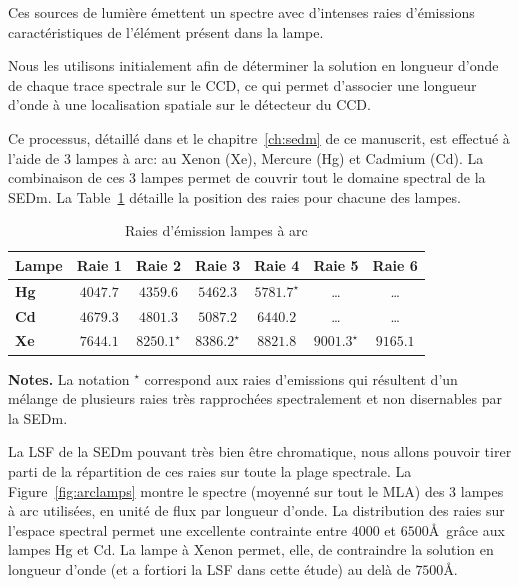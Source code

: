 \documentclass[../main/main.tex]{subfiles}
\begin{document}
Ces sources de lumière émettent un spectre avec d'intenses raies
d'émissions caractéristiques de l'élément présent dans la lampe.

Nous les utilisons initialement afin de déterminer la solution en longueur
d'onde de chaque trace spectrale sur le CCD, ce qui permet d'associer une longueur d'onde à une localisation spatiale
sur le détecteur du CCD.

Ce processus, détaillé dans \citet{pysedm} et le chapitre~\ref{ch:sedm}
de ce manuscrit, est effectué à l'aide de $3$ lampes à arc: au Xenon (Xe),
Mercure (Hg) et Cadmium (Cd). La combinaison de ces $3$ lampes permet de
couvrir tout le domaine spectral de la SEDm. La
Table~\ref{tab:linearclamp} détaille la position des raies pour chacune
des lampes.

\begin{table}[ht]
  \centerfloat
  \renewcommand{\arraystretch}{1.5}
    \begin{threeparttable}
        \caption{Raies d'émission lampes à arc}
        \label{tab:linearclamp}
        
        \begin{tabular}{lcccccc}
        \toprule
          \textbf{Lampe} &  Raie 1 &  Raie 2 & Raie 3 & Raie 4 & Raie 5 & Raie 6 \\
        \midrule
          \textbf{Hg} & $4047.7$  &  $4359.6$  &  $5462.3$  &  $5781.7^{\star}$  &  \ldots  & \ldots \\
          \textbf{Cd} & $4679.3$  & $4801.3$   & $5087.2$   & $6440.2$ &  \ldots  &  \ldots  \\
          \textbf{Xe} & $7644.1$  & $8250.1^{\star}$  & $8386.2^{\star}$  & $8821.8$  &  $9001.3^{\star}$  &  $9165.1$ \\
          \bottomrule
        \end{tabular}
        \begin{tablenotes}[flushleft]
        \item \textbf{Notes.} La notation $ ^{\star}$ correspond aux
          raies d'emissions qui résultent d'un mélange de plusieurs raies très
          rapprochées spectralement et non disernables par la SEDm.
        \end{tablenotes}
    \end{threeparttable}
  \end{table}

La LSF de la SEDm pouvant très bien être chromatique, nous allons
pouvoir tirer parti de la répartition de ces raies sur toute la plage
spectrale. La Figure~\ref{fig:arclamps} montre le spectre (moyenné sur
tout le MLA) des $3$ lampes à arc utilisées, en unité de flux par
longueur d'onde. La distribution des raies sur l'espace spectral permet
une excellente contrainte entre $4000$ et $6500$\AA\ grâce aux lampes Hg et
Cd. La lampe à Xenon permet, elle, de contraindre la solution en longueur
d'onde (et a fortiori la LSF dans cette étude) au delà de $7500$\AA.
\end{document}
